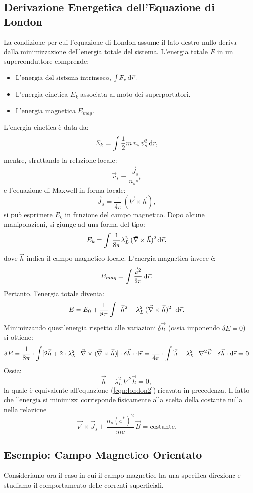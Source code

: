 \subsection{Derivazione Energetica dell'Equazione di London}
La condizione per cui l'equazione di London assume il lato destro nullo deriva dalla minimizzazione dell'energia totale del sistema. L'energia totale \(E\) in un superconduttore comprende:
\begin{itemize}
    \item L'energia del sistema intrinseco, \( \int F_s \, \text{d}\vec{r} \).
    \item L'energia cinetica \(E_k\) associata al moto dei superportatori.
    \item L'energia magnetica \(E_{mag}\).
\end{itemize}
L'energia cinetica è data da:
\[
E_k = \int \frac{1}{2} m\, n_s\, \vec{v}_s^2 \, \text{d}\vec{r},
\]
mentre, sfruttando la relazione locale:
\[
\vec{v}_s = \frac{\vec{J}_s}{n_s e^*}
\]
e l'equazione di Maxwell in forma locale:
\[
\vec{J}_s = \frac{c}{4\pi}\, (\vec{\nabla} \times \vec{h}),
\]
si può esprimere \(E_k\) in funzione del campo magnetico. Dopo alcune manipolazioni, si giunge ad una forma del tipo:
\[
E_k = \int \frac{1}{8\pi} \lambda_L^2\, (\vec{\nabla} \times \vec{h})^2\, \text{d}\vec{r},
\]
dove \(\vec{h}\) indica il campo magnetico locale.
L'energia magnetica invece è:
\[
E_{mag} = \int \frac{\vec{h}^2}{8\pi}\, \text{d}\vec{r}.
\]
Pertanto, l'energia totale diventa:
\[
E = E_0 + \frac{1}{8\pi}\int \left[\vec{h}^2 + \lambda_L^2\, (\vec{\nabla} \times \vec{h})^2\right] \text{d}\vec{r}.
\]
Minimizzando quest'energia rispetto alle variazioni \(\delta \vec{h}\) (ossia imponendo \(\delta E = 0\)) si ottiene:
\[\delta E = \frac{1}{8\pi} \cdot \int [2\vec{h}+2\cdot \lambda^2_L\cdot\vec{\nabla}\times(\vec{\nabla}\times \vec{h})]\cdot\delta \vec{h}\cdot \text{d}\vec{r} = \frac{1}{4\pi}\cdot \int [\vec{h}-\lambda^2_L\cdot \nabla^2\vec{h}]\cdot\delta \vec{h}\cdot \text{d}\vec{r}= 0\]
Ossia:
\[
\vec{h} - \lambda_L^2 \, \nabla^2 \vec{h} = 0,
\]
la quale è equivalente all'equazione (\ref{eqn:london2}) ricavata in precedenza. Il fatto che l'energia si minimizzi corrisponde fisicamente alla scelta della costante nulla nella relazione
\[
\vec{\nabla} \times \vec{J}_s + \frac{n_s (e^*)^2}{mc}\, \vec{B} = \text{costante}.
\]

\subsection{Esempio: Campo Magnetico Orientato}
Consideriamo ora il caso in cui il campo magnetico ha una specifica direzione e studiamo il comportamento delle correnti superficiali.\\
